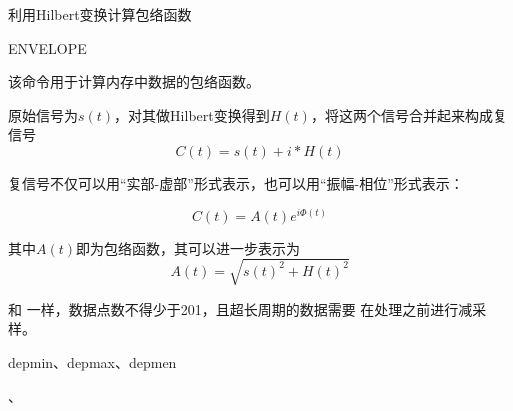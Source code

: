 \label{cmd:envelope}

利用Hilbert变换计算包络函数

\begin{SACSTX}
ENVELOPE
\end{SACSTX}

该命令用于计算内存中数据的包络函数。

原始信号为$s(t)$，对其做Hilbert变换得到$H(t)$，将这两个信号合并起来构成复信号
\[
    C(t) = s(t) + i*H(t)
\]

复信号不仅可以用``实部-虚部''形式表示，也可以用``振幅-相位''形式表示：

\[
    C(t) = A(t) e^{i\Phi(t)}
\]

其中$A(t)$即为包络函数，其可以进一步表示为
\[
    A(t) = \sqrt{s(t)^2+H(t)^2}
\]

和  一样，数据点数不得少于201，且超长周期的数据需要
在处理之前进行减采样。

depmin、depmax、depmen

、
